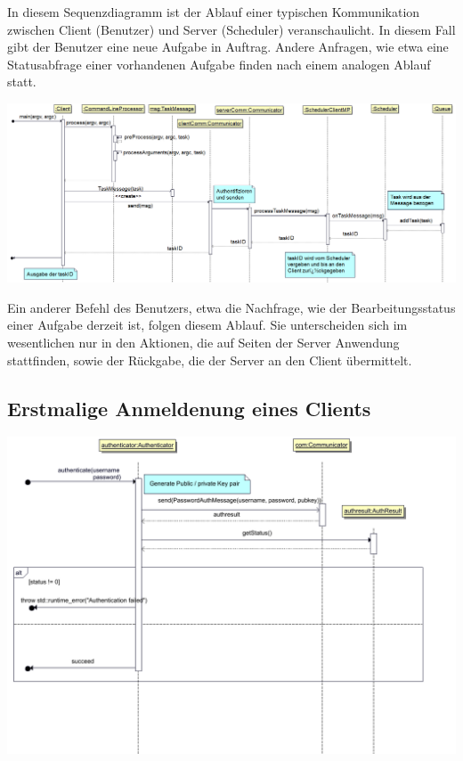 \documentclass[a4paper,12pt]{article}
\begin{document}
In diesem Sequenzdiagramm ist der Ablauf einer typischen Kommunikation zwischen Client (Benutzer) und Server (Scheduler) veranschaulicht. In diesem Fall gibt der Benutzer eine neue Aufgabe in Auftrag. Andere Anfragen, wie etwa eine Statusabfrage einer vorhandenen Aufgabe finden nach einem analogen Ablauf statt.

\includegraphics[width=\textwidth]{createTask}

Ein anderer Befehl des Benutzers, etwa die Nachfrage, wie der Bearbeitungsstatus einer Aufgabe derzeit ist, folgen diesem Ablauf. Sie unterscheiden sich im wesentlichen nur in den Aktionen, die auf Seiten der Server Anwendung stattfinden, sowie der Rückgabe, die der Server an den Client übermittelt.

\clearpage

\subsection{Erstmalige Anmeldenung eines Clients}

\includegraphics[width=\textwidth]{Authenticator/ClientAuth}
\end{document}
